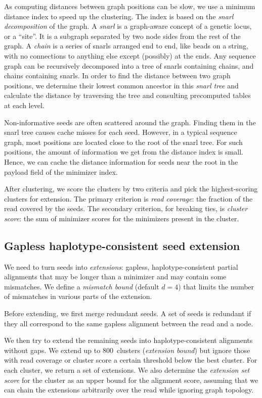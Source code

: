 \documentclass[11pt]{ucscthesis}
\newcommand{\param}[1]{\emph{#1}}
\newcommand{\vocab}[1]{\emph{#1}}
\begin{document}
As computing distances between graph positions can be slow, we use a minimum distance index \cite{chang_distance_2020} to speed up the clustering.
The index is based on the \vocab{snarl decomposition} of the graph.
A \vocab{snarl}\cite{paten_superbubbles_2018} is a graph-aware concept of a genetic locus, or a ``site''.
It is a subgraph separated by two node sides from the rest of the graph.
A \vocab{chain} is a series of snarls arranged end to end, like beads on a string, with no connections to anything else except (possibly) at the ends.
Any sequence graph can be recursively decomposed into a tree of snarls containing chains, and chains containing snarls.
In order to find the distance between two graph positions, we determine their lowest common ancestor in this \vocab{snarl tree} and calculate the distance by traversing the tree and consulting precomputed tables at each level.

Non-informative seeds are often scattered around the graph.
Finding them in the snarl tree causes cache misses for each seed.
However, in a typical sequence graph, most positions are located close to the root of the snarl tree.
For such positions, the amount of information we get from the distance index is small.
Hence, we can cache the distance information for seeds near the root in the payload field of the minimizer index.

After clustering, we score the clusters by two criteria and pick the highest-scoring clusters for extension.
The primary criterion is \vocab{read coverage}: the fraction of the read covered by the seeds.
The secondary criterion, for breaking ties, is \vocab{cluster score}: the sum of minimizer scores for the minimizers present in the cluster.

\subsection{Gapless haplotype-consistent seed extension}
\label{subsec:aim2:gapless-extension}
We need to turn seeds into \vocab{extensions}: gapless, haplotype-consistent partial alignments that may be longer than a minimizer and may contain some mismatches. We define a \param{mismatch bound} (default $d = 4$) that limits the number of mismatches in various parts of the extension.

Before extending, we first merge redundant seeds.
A set of seeds is redundant if they all correspond to the same gapless alignment between the read and a node.

We then try to extend the remaining seeds into haplotype-consistent alignments without gaps.
We extend up to 800~clusters (\param{extension bound}) but ignore those with read coverage or cluster score a certain threshold below the best cluster.
For each cluster, we return a set of extensions.
We also determine the \vocab{extension set score} for the cluster as an upper bound for the alignment score, assuming that we can chain the extensions arbitrarily over the read while ignoring graph topology.
\end{document}
